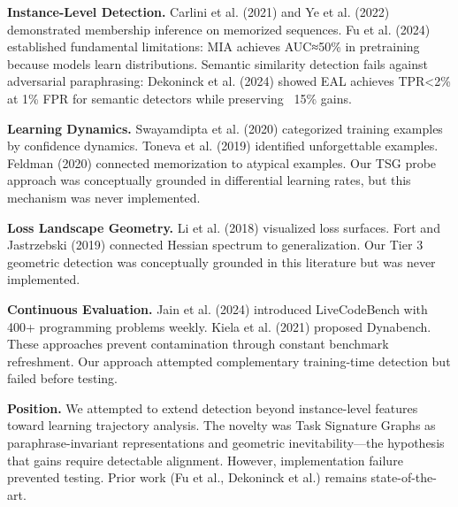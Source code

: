 
\textbf{Instance-Level Detection.} Carlini et al. (2021) and Ye et al. (2022) demonstrated membership inference on memorized sequences. Fu et al. (2024) established fundamental limitations: MIA achieves AUC≈50\% in pretraining because models learn distributions. Semantic similarity detection fails against adversarial paraphrasing: Dekoninck et al. (2024) showed EAL achieves TPR<2\% at 1\% FPR for semantic detectors while preserving ~15\% gains.

\textbf{Learning Dynamics.} Swayamdipta et al. (2020) categorized training examples by confidence dynamics. Toneva et al. (2019) identified unforgettable examples. Feldman (2020) connected memorization to atypical examples. Our TSG probe approach was conceptually grounded in differential learning rates, but this mechanism was never implemented.

\textbf{Loss Landscape Geometry.} Li et al. (2018) visualized loss surfaces. Fort and Jastrzebski (2019) connected Hessian spectrum to generalization. Our Tier 3 geometric detection was conceptually grounded in this literature but was never implemented.

\textbf{Continuous Evaluation.} Jain et al. (2024) introduced LiveCodeBench with 400+ programming problems weekly. Kiela et al. (2021) proposed Dynabench. These approaches prevent contamination through constant benchmark refreshment. Our approach attempted complementary training-time detection but failed before testing.

\textbf{Position.} We attempted to extend detection beyond instance-level features toward learning trajectory analysis. The novelty was Task Signature Graphs as paraphrase-invariant representations and geometric inevitability—the hypothesis that gains require detectable alignment. However, implementation failure prevented testing. Prior work (Fu et al., Dekoninck et al.) remains state-of-the-art.
